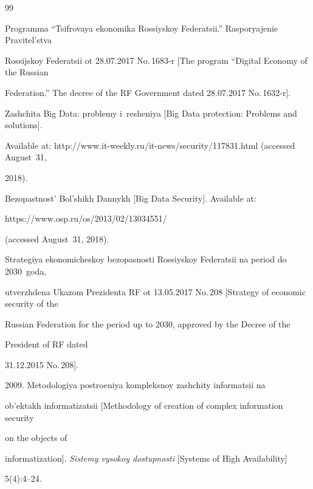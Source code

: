 {\small\frenchspacing

{%


\begin{thebibliography}{99}


Programma ``Tsifrovaya ekonomika Rossiyskoy Federatsii.'' Rasporyajenie Pravitel'stva 

Rossijskoy Federatsii ot 28.07.2017 No.\,1683-r [The program ``Digital Economy of the Russian 

Federation.'' The decree of the RF Government dated 28.07.2017 No.\,1632-r].


Zashchita Big Data: problemy i~resheniya [Big Data protection: Problems and solutions]. 

Available at: {\sf http://www.it-weekly.ru/it-news/security/}117831.html (accessed August~31, 

2018).


 Bezopastnost' Bol'shikh Dannykh [Big Data Security]. Available at: {\sf 

https://www.osp.ru/os/2013/02/13034551/} (accessed August~31, 2018).


Strategiya ekonomicheskoy bezopasnosti Rossiyskoy Federatsii na period do 2030~goda, 

utverzhdena Ukazom Prezidenta RF ot 13.05.2017 No.\,208 [Strategy of economic security of the 

Russian Federation for the period up to 2030, approved by the Decree of the 

President of RF dated 

31.12.2015 No.\,208].


 2009. Metodologiya postroeniya kompleksnoy zashchity informatsii na 

ob'ektakh informatizatsii [Methodology of creation of complex information security 

on the objects of 

informatization]. \textit{Sistemy vysokoy dostupnosti} [Systems of High Availability]  

5(4):4--24.



\end{thebibliography}}}
